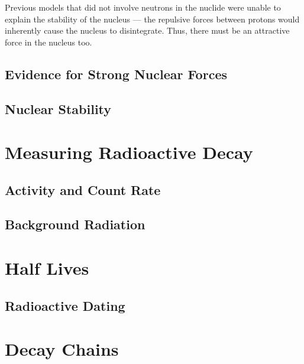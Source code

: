 \documentclass[a4paper,12pt]{article}
\let\oldsection\section
\renewcommand\section{\clearpage\oldsection}
\begin{document}
Previous models that did not involve neutrons in the nuclide were unable to explain the stability of the nucleus --- the repulsive forces between protons would inherently cause the nucleus to disintegrate. Thus, there must be an attractive force in the nucleus too.

\subsection{Evidence for Strong Nuclear Forces}

\subsection{Nuclear Stability}

\section{Measuring Radioactive Decay}

\subsection{Activity and Count Rate}

\subsection{Background Radiation}

\section{Half Lives}

\subsection{Radioactive Dating}

\section{Decay Chains}
\end{document}

